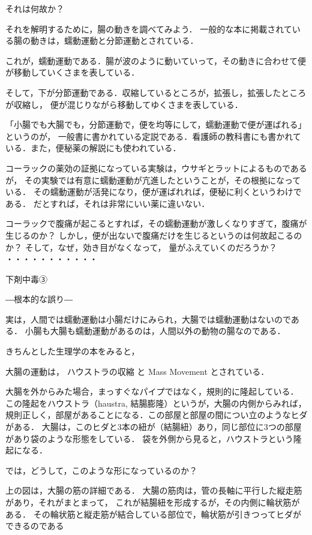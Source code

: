 それは何故か？

それを解明するために，腸の動きを調べてみよう．
一般的な本に掲載されている腸の動きは，蠕動運動と分節運動とされている． 




これが，蠕動運動である．腸が波のように動いていって，その動きに合わせて便が移動していくさまを表している．

そして，下が分節運動である．収縮しているところが，拡張し，拡張したところが収縮し，
便が混じりながら移動してゆくさまを表している． 



「小腸でも大腸でも，分節運動で，便を均等にして，蠕動運動で便が運ばれる」というのが，
一般書に書かれている定説である．看護師の教科書にも書かれている．また，便秘薬の解説にも使われている．

コーラックの薬効の証拠になっている実験は，ウサギとラットによるものであるが，
その実験では有意に蠕動運動が亢進したということが，その根拠になっている．
その蠕動運動が活発になり，便が運ばれれば，便秘に利くというわけである．
だとすれば，それは非常にいい薬に違いない．

コーラックで腹痛が起こるとすれば，その蠕動運動が激しくなりすぎて，腹痛が生じるのか？
しかし，便が出ないで腹痛だけを生じるというのは何故起こるのか？
そして，なぜ，効き目がなくなって，
量がふえていくのだろうか？
・・・・・・・・・・・

下剤中毒③

―根本的な誤り―

実は，人間では蠕動運動は小腸だけにみられ，大腸では蠕動運動はないのである．
 小腸も大腸も蠕動運動があるのは，人間以外の動物の腸なのである． 

きちんとした生理学の本をみると，

大腸の運動は，
ハウストラの収縮
と
Mass Movement 
とされている．

大腸を外からみた場合，まっすぐなパイプではなく，規則的に隆起している．
この隆起をハウストラ（haustra, 結腸膨隆）というが，大腸の内側からみれば，
規則正しく，部屋があることになる．この部屋と部屋の間につい立のようなヒダがある． 
大腸は，このヒダと3本の紐が（結腸紐）あり，同じ部位に3つの部屋があり袋のような形態をしている． 
袋を外側から見ると，ハウストラという隆起になる． 




では，どうして，このような形になっているのか？




上の図は，大腸の筋の詳細である．
大腸の筋肉は，管の長軸に平行した縦走筋があり，それがまとまって，
これが結腸紐を形成するが，その内側に輪状筋がある．
その輪状筋と縦走筋が結合している部位で，輪状筋が引きつってヒダができるのである 




